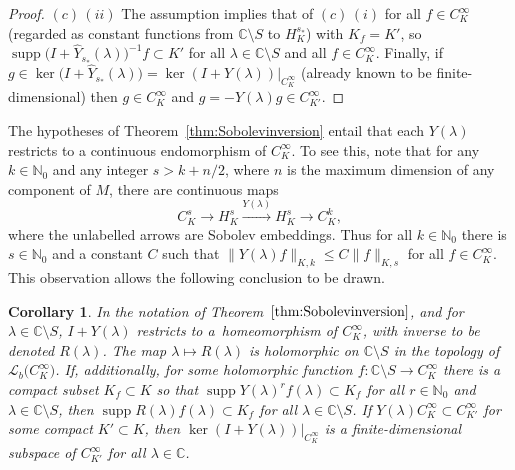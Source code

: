 \documentclass[pdftex]{sigma}
\numberwithin{equation}{section}
\newtheorem{Corollary}[Theorem]{Corollary}
\newcommand{\CC}{{\mathbb C}}
\newcommand{\NN}{{\mathbb N}}
\newcommand{\LL}{{\mathcal L}}
\DeclareMathOperator{\supp}{supp}
\begin{document}
\begin{proof}
 	$(c)$\,$(ii)$ The assumption implies that of $(c)$\,$(i)$ for all $f\in C^\infty_K$ \big(regarded as constant functions from $\CC\setminus S$ to $H^{s_*}_K$\big) with $K_f=K'$, so
 	$\supp \big(I+\hat{Y}_{s_*}(\lambda)\big)^{-1}f\subset K'$ for all $\lambda\in \CC\setminus S$ and all $f\in C^\infty_K$. Finally,
 	if $g\in \ker \big(I+\hat{Y}_{s_*}(\lambda)\big)=\ker (I+ Y(\lambda))|_{C^\infty_K}$ (already known to be finite-dimensional) then $g\in C^\infty_K$ and $g=- Y(\lambda) g\in C^\infty_{K'}$.
 \end{proof}

 The hypotheses of Theorem~\ref{thm:Sobolevinversion} entail that each $Y(\lambda)$ restricts to a continuous endomorphism of $C^\infty_K$. To see this, note that for any $k\in\NN_0$ and any integer $s>k+n/2$, where $n$ is the maximum dimension of any component of $M$, there are continuous maps
 \begin{equation*}
 	C^s_K \longrightarrow H^s_K \stackrel{Y(\lambda)}{\longrightarrow} H^s_K \longrightarrow C^k_K,
 \end{equation*}
 where the unlabelled arrows are Sobolev embeddings. Thus for all $k\in \NN_0$ there is $s\in \NN_0$ and a constant $C$ such that
 $\|Y(\lambda)f\|_{K,k}\le C \|f\|_{K,s}$ for all $f\in C^\infty_K$. This observation allows the following conclusion to be drawn.
 \begin{Corollary}\label{cor:CKinfty_inversion}
 	In the notation of Theorem~$\ref{thm:Sobolevinversion}$, and for $\lambda\in\CC\setminus S$, $I+ Y(\lambda)$ restricts to a~homeomorphism of $C^\infty_K$, with inverse to be denoted $R(\lambda)$. The map $\lambda\mapsto R(\lambda)$ is
 	holomorphic on $\CC\setminus S$ in the topology of $\LL_b\big(C^\infty_K\big)$.
 	If, additionally, for some holomorphic function $f\colon \CC\setminus S\to C^\infty_K$
 	there is a compact subset $K_f\subset K$ so that $\supp Y(\lambda)^r f(\lambda)\subset K_f$ for all $r\in\NN_0$ and $\lambda\in \CC\setminus S$, then $\supp R(\lambda) f(\lambda)\subset K_f$ for all $\lambda\in \CC\setminus S$. If $Y(\lambda)C^\infty_K\subset C^\infty_{K'}$ for some compact $K'\subset K$, then
 	$\ker(I+ Y(\lambda))|_{C^\infty_K}$ is a finite-dimensional subspace of $C^\infty_{K'}$
 	for all $\lambda\in\CC$.
 \end{Corollary}
\end{document}
